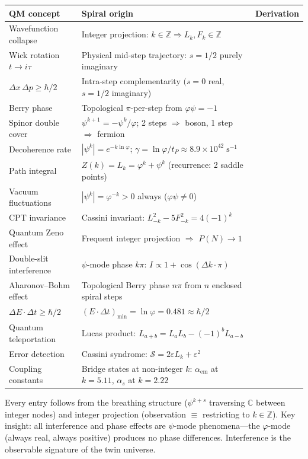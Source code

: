 \documentclass[12pt,a4paper]{article}
\begin{document}
\begin{center}\small
\begin{tabular}{|l|p{4.8cm}|p{3.8cm}|}
\hline
\textbf{QM concept} & \textbf{Spiral origin} & \textbf{Derivation} \\
\hline\hline
Wavefunction collapse & Integer projection: $k \in \mathbb{Z} \Rightarrow L_k, F_k \in \mathbb{Z}$ \\
Wick rotation $t \to i\tau$ & Physical mid-step trajectory: $s=1/2$ purely imaginary \\
$\Delta x\,\Delta p \geq \hbar/2$ & Intra-step complementarity $(s=0$ real, $s=1/2$ imaginary) \\
Berry phase & Topological $\pi$-per-step from $\varphi\psi = -1$ \\
Spinor double cover & $\psi^{k+1} = -\psi^k/\varphi$; 2 steps $\Rightarrow$ boson, 1 step $\Rightarrow$ fermion \\
Decoherence rate & $|\psi^k| = e^{-k\ln\varphi}$; $\gamma = \ln\varphi/t_P \approx 8.9 \times 10^{42}\;\mathrm{s}^{-1}$ \\
Path integral & $Z(k) = L_k = \varphi^k + \psi^k$ (recurrence: 2 saddle points) \\
Vacuum fluctuations & $|\psi^k| = \varphi^{-k} > 0$ always ($\varphi\psi \neq 0$) \\
CPT invariance & Cassini invariant: $L_{-k}^2 - 5F_{-k}^2 = 4(-1)^k$ \\
Quantum Zeno effect & Frequent integer projection $\Rightarrow$ $P(N) \to 1$ \\
Double-slit interference & $\psi$-mode phase $k\pi$: $I \propto 1 + \cos(\Delta k \cdot \pi)$ \\
Aharonov--Bohm effect & Topological Berry phase $n\pi$ from $n$ enclosed spiral steps \\
$\Delta E \cdot \Delta t \geq \hbar/2$ & $(E \cdot \Delta t)_{\min} = \ln\varphi = 0.481 \approx \hbar/2$ \\
Quantum teleportation & Lucas product: $L_{a+b} = L_a L_b - (-1)^b L_{a-b}$ \\
Error detection & Cassini syndrome: $\mathcal{S} = 2\varepsilon L_k + \varepsilon^2$ \\
Coupling constants & Bridge states at non-integer $k$: $\alpha_{\mathrm{em}}$ at $k=5.11$, $\alpha_s$ at $k=2.22$ \\
\hline
\end{tabular}
\end{center}

\noindent Every entry follows from the breathing structure ($\psi^{k+s}$ traversing $\mathbb{C}$ between integer nodes) and integer projection (observation $\equiv$ restricting to $k \in \mathbb{Z}$).  Key insight: all interference and phase effects are $\psi$-mode phenomena---the $\varphi$-mode (always real, always positive) produces no phase differences.  Interference is the observable signature of the twin universe.
\end{document}
